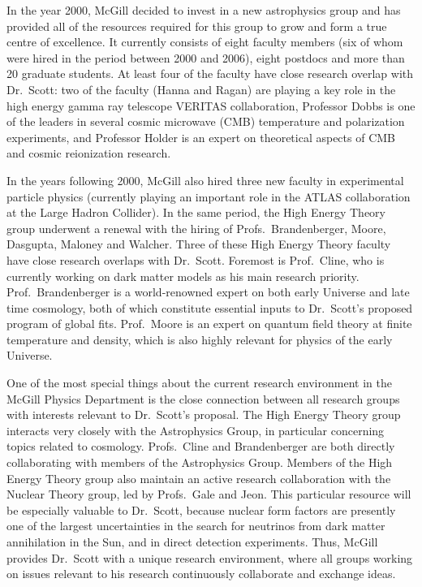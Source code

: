 \documentclass[10pt,oneside,onecolumn,a4paper]{article}
\begin{document}
In the year 2000, McGill decided to invest in a new astrophysics
group and has provided all of the resources required for this group
to grow and form a true centre of excellence. It currently consists
of eight faculty members (six of whom were hired in the period
between 2000 and 2006), eight postdocs and more than 20 graduate
students. At least four of the faculty have close research overlap
with Dr.\ Scott: two of the faculty (Hanna and Ragan) are playing a key role in 
the high energy gamma ray telescope VERITAS collaboration, Professor
Dobbs is one of the leaders in several cosmic microwave (CMB) temperature
and polarization experiments, and Professor Holder is an expert
on theoretical aspects of CMB and cosmic reionization research. 

In the years following 2000, McGill also hired three new faculty in
experimental particle physics (currently playing an important
role in the ATLAS collaboration at the Large Hadron Collider). In the same period,
the High Energy Theory group underwent a renewal with the hiring of
Profs.\ Brandenberger, Moore, Dasgupta, Maloney and Walcher. Three
of these High Energy Theory faculty have close research overlaps
with Dr.\ Scott.  Foremost is Prof.\ Cline, who is currently working
on dark matter models as his main research priority.  Prof.\ Brandenberger
is a world-renowned expert on both early Universe and late time cosmology, both
of which constitute essential inputs to Dr.\ Scott's proposed program of global fits. Prof.\ Moore is an expert on
quantum field theory at finite temperature and density, which is also highly relevant for physics of the early Universe.

One of the most special things about the current research environment in the
McGill Physics Department is the close connection between all research
groups with interests relevant to Dr.\ Scott's
proposal. The High Energy Theory group interacts very closely
with the Astrophysics Group, in particular concerning topics related
to cosmology. Profs.\ Cline and Brandenberger are both directly
collaborating with members of the Astrophysics Group. Members of
the High Energy Theory group also maintain an active research collaboration
with the Nuclear Theory group, led by Profs.\ Gale and Jeon.  This particular resource will be especially valuable to Dr.\ Scott, because nuclear form factors are presently one of the largest uncertainties in the search for neutrinos from dark matter annihilation in the Sun, and in direct detection experiments.  Thus, McGill provides Dr.\ Scott with a unique research environment, where all
groups working on issues relevant to his research continuously collaborate
and exchange ideas.
\end{document}
